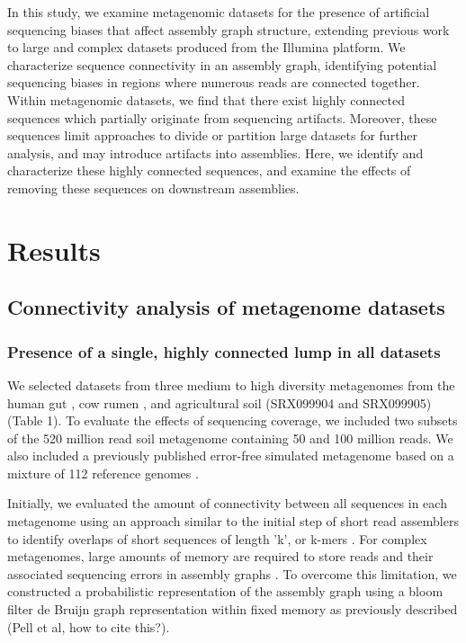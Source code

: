 \documentclass[10pt]{article}
\begin{document}
In this study, we examine metagenomic datasets for the presence of
artificial sequencing biases that affect assembly graph structure,
extending previous work to large and complex datasets produced from
the Illumina platform. We characterize sequence connectivity in an
assembly graph, identifying potential sequencing biases in regions
where numerous reads are connected together.  Within metagenomic
datasets, we find that there exist highly connected sequences which
partially originate from sequencing artifacts.  Moreover,
these sequences limit approaches to divide or partition large datasets
for further analysis, and may introduce artifacts into assemblies.  Here, we
identify and characterize these highly connected
sequences, and examine the effects of removing these sequences on
downstream assemblies.

\section*{Results}

\subsection*{Connectivity analysis of metagenome datasets}

\subsubsection*{Presence of a single, highly connected lump in all datasets}
We selected datasets from three medium to high diversity
metagenomes from the human gut \cite{Qin:2010p189}, cow rumen
\cite{Hess:2011p686}, and agricultural soil (SRX099904 and SRX099905)
(Table 1).  To
evaluate the effects of sequencing coverage, we included two subsets
of the 520 million read soil metagenome containing 50 and 100 million
reads.  We also included a previously published error-free simulated
metagenome based on a mixture of 112 reference genomes
\cite{Pignatelli:2011p742}.

Initially, we evaluated the amount of connectivity between all
sequences in each metagenome using an approach similar to the initial
step of short read assemblers to identify overlaps of short sequences
of length 'k', or k-mers
\cite{Peng:2011p898,Simpson:2009p233,Zerbino:2008p665}.  For complex
metagenomes, large amounts of memory are required to store reads and
their associated sequencing errors in assembly graphs
\cite{Hess:2011p686,Mackelprang:2011p1087,Qin:2010p189}.  To overcome
this limitation, we constructed a probabilistic representation of the
assembly graph using a bloom filter de Bruijn graph representation
within fixed memory as previously described (Pell et al, how to cite
this?).
\end{document}
